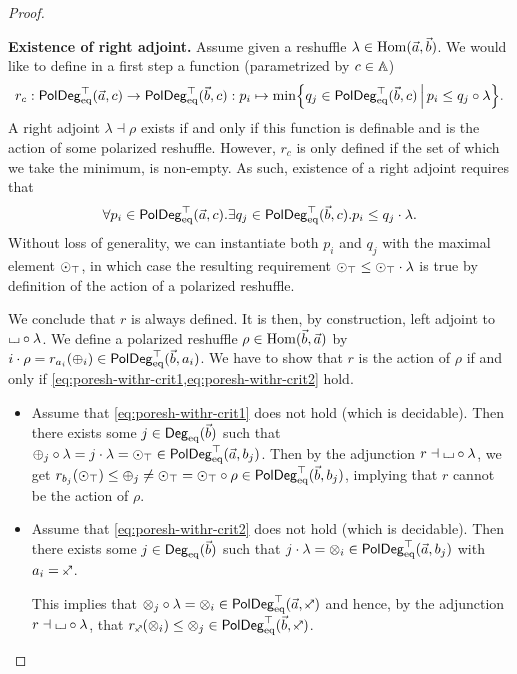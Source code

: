 \documentclass[a4paper]{memoir}
\begin{document}
\begin{proof}
\begin{enumerate}
		\textbf{Existence of right adjoint.}
		Assume given a reshuffle $\lambda \in {\mathrm{Hom}}(\vec a, \vec b)$.
		We would like to define in a first step a function (parametrized by $c \in {\mathbb{A}}$)
		\[
			r_c : \mathsf{PolDeg}_{\mathrm{eq}}^\top(\vec a, c) \to \mathsf{PolDeg}_{\mathrm{eq}}^\top(\vec b, c) : p_i \mapsto \min \mathopen{}\left\{ q_j \in \mathsf{PolDeg}_{\mathrm{eq}}^\top(\vec b, c) \,\middle|\, p_i \leq q_j \circ \lambda \right\}\mathclose{}.
		\]
		A right adjoint $\lambda \dashv \rho$ exists if and only if this function is definable and is the action of some polarized reshuffle.
		However, $r_c$ is only defined if the set of which we take the minimum, is non-empty.
		As such, existence of a right adjoint requires that
		\[
			\forall p_i \in \mathsf{PolDeg}_{\mathrm{eq}}^\top(\vec a, c) . \exists q_j \in \mathsf{PolDeg}_{\mathrm{eq}}^\top(\vec b, c). p_i \leq q_j \cdot \lambda.
		\]
		Without loss of generality, we can instantiate both $p_i$ and $q_j$ with the maximal element ${\odot}_\top$, in which case the resulting requirement ${\odot}_\top \leq {\odot}_\top \cdot \lambda$ is true by definition of the action of a polarized reshuffle.
		
		We conclude that $r$ is always defined.
		It is then, by construction, left adjoint to ${\llcorner\hspace{-.4ex}\lrcorner} \circ \lambda$.
		We define a polarized reshuffle $\rho \in {\mathrm{Hom}}(\vec b, \vec a)$ by $i \cdot \rho = r_{a_i}({\oplus}_i) \in \mathsf{PolDeg}_{\mathrm{eq}}^\top(\vec b, a_i)$.
		We have to show that $r$ is the action of $\rho$ if and only if \cref{eq:poresh-withr-crit1,eq:poresh-withr-crit2} hold.
		\begin{itemize}
			\item Assume that \cref{eq:poresh-withr-crit1} does not hold (which is decidable).
			Then there exists some $j \in {\mathsf{Deg}_{\mathrm{eq}}}(\vec b)$ such that ${\oplus}_j \circ \lambda = j \cdot \lambda = {\odot}_\top \in \mathsf{PolDeg}_{\mathrm{eq}}^\top(\vec a, b_j)$.
			Then by the adjunction $r \dashv {\llcorner\hspace{-.4ex}\lrcorner} \circ \lambda$, we get
			$r_{b_j}({\odot}_\top) \leq {\oplus}_j \neq {\odot}_\top = {\odot}_\top \circ \rho \in \mathsf{PolDeg}_{\mathrm{eq}}^\top(\vec b, b_j)$, implying that $r$ cannot be the action of $\rho$.
			
			\item Assume that \cref{eq:poresh-withr-crit2} does not hold (which is decidable).
			Then there exists some $j \in {\mathsf{Deg}_{\mathrm{eq}}}(\vec b)$ such that $j \cdot \lambda = {\otimes}_i \in \mathsf{PolDeg}_{\mathrm{eq}}^\top(\vec a, b_j)$ with $a_i = \ypolar$.
			
			This implies that $\mixpol_j \circ \lambda = \mixpol_i \in \poldegeqtop(\vec a, \ypolar)$ and hence, by the adjunction $r \dashv {\llcorner\hspace{-.4ex}\lrcorner} \circ \lambda$, that $r_\ypolar(\mixpol_i) \leq \mixpol_j \in \poldegeqtop(\vec b, \ypolar)$.
			

\end{itemize}
\end{enumerate}
\end{proof}
\end{document}
